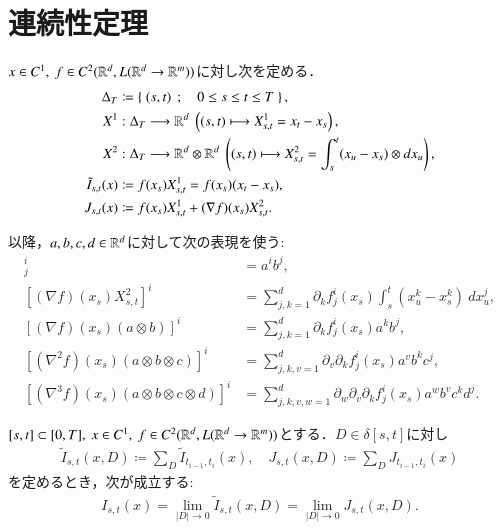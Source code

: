 \section{連続性定理}
	\begin{screen}
		\begin{dfn}[記号の定義]
			$x \in C^1,\ f \in C^2(\mathbb{R}^d,L(\mathbb{R}^d \rightarrow \mathbb{R}^m))$に対し次を定める．
			\begin{align}
				\Delta_T &\coloneqq \Set{(s,t)}{0 \leq s \leq t \leq T}, \\
				X^1 &:\Delta_T \longrightarrow \R^d\ \left( (s,t) \longmapsto X^1_{s,t} = x_t - x_s \right), \\
				X^2 &:\Delta_T \longrightarrow \R^d \otimes \R^d\ \left( (s,t) \longmapsto X^2_{s,t} = \int_s^t (x_u - x_s) \otimes dx_u \right), \\
				\tilde{I}_{s,t}(x) &\coloneqq f(x_s)X^1_{s,t} = f(x_s)(x_t - x_s), \\
				J_{s,t}(x) &\coloneqq f(x_s)X^1_{s,t} + (\nabla f)(x_s)X^2_{s,t}.
			\end{align}
		\end{dfn}
	\end{screen}
	
	以降，$a,b,c,d \in \mathbb{R}^d$に対して次の表現を使う:
	\begin{align}
		[a \otimes b]^i_j &= a^i b^j, \\
		\left[ (\nabla f)(x_s)X^2_{s,t} \right]^i &= \sum_{j,k=1}^d \partial_k f^i_j(x_s) \int_s^t \left(x^k_u - x^k_s \right)\ dx^j_u,\\
		\left[ (\nabla f)(x_s)(a \otimes b) \right]^i &= \sum_{j,k=1}^d \partial_k f^i_j(x_s) a^k b^j,\\
		\left[ (\nabla^2 f)(x_s)(a \otimes b \otimes c) \right]^i &= \sum_{j,k,v=1}^d \partial_v \partial_k f^i_j(x_s) a^v b^k c^j,\\
		\left[ (\nabla^3 f)(x_s)(a \otimes b \otimes c \otimes d) \right]^i &= \sum_{j,k,v,w=1}^d \partial_w \partial_v \partial_k f^i_j(x_s) a^w b^v c^k d^j.
	\end{align}
	
	\begin{screen}
		\begin{thm}\label{thm:Riemann_Stieltjes_approximation}
			$[s,t] \subset [0,T],\ x \in C^1,\ f \in C^2(\mathbb{R}^d,L(\mathbb{R}^d \rightarrow \mathbb{R}^m))$とする．$D \in \delta[s,t]$に対し
			\begin{align}
				\tilde{I}_{s,t}(x,D) \coloneqq \sum_D \tilde{I}_{t_{i-1},t_i}(x),
				\quad J_{s,t}(x,D) \coloneqq \sum_D J_{t_{i-1},t_i}(x)
			\end{align}
			を定めるとき，次が成立する:
			\begin{align}
				I_{s,t}(x) = \lim_{|D| \to 0} \tilde{I}_{s,t}(x,D)
				= \lim_{|D| \to 0} J_{s,t}(x,D).
			\end{align}
		\end{thm}
	\end{screen}
	
